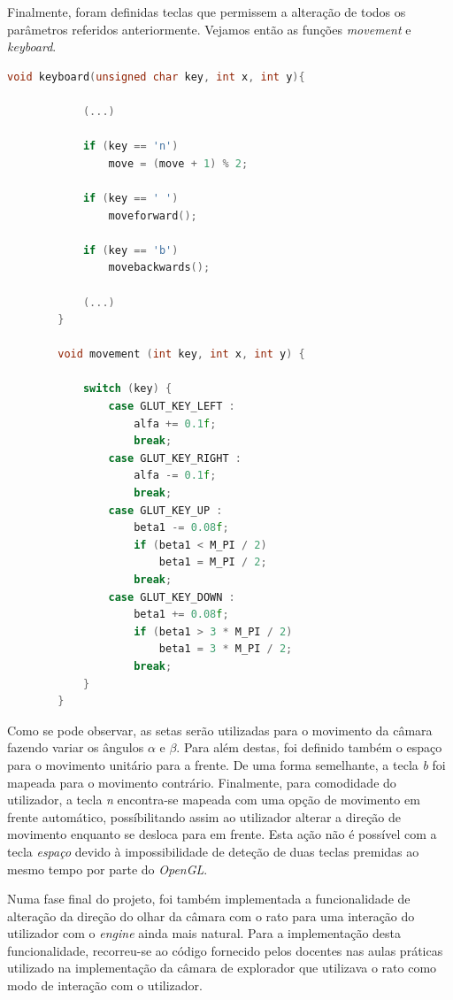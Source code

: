 \documentclass[a4paper]{article}
\begin{document}
Finalmente, foram definidas teclas que permissem a alteração de todos os parâmetros referidos anteriormente. Vejamos então as funções \textit{movement} e \textit{keyboard}.

\begin{lstlisting}[language=C++, caption=Definição das funções responsáveis pelo movimento para frente e trás da câmara.]
        void keyboard(unsigned char key, int x, int y){

            (...)

            if (key == 'n')
                move = (move + 1) % 2;

            if (key == ' ')
                moveforward();

            if (key == 'b')
                movebackwards();

            (...)
        }

        void movement (int key, int x, int y) {

            switch (key) {
                case GLUT_KEY_LEFT :
                    alfa += 0.1f;
                    break;
                case GLUT_KEY_RIGHT :
                    alfa -= 0.1f;
                    break;
                case GLUT_KEY_UP :
                    beta1 -= 0.08f;
                    if (beta1 < M_PI / 2)
                        beta1 = M_PI / 2;
                    break;
                case GLUT_KEY_DOWN :
                    beta1 += 0.08f;
                    if (beta1 > 3 * M_PI / 2)
                        beta1 = 3 * M_PI / 2;
                    break;
            }
        }
\end{lstlisting}

Como se pode observar, as setas serão utilizadas para o movimento da câmara fazendo variar os ângulos $\alpha$ e $\beta$. Para além destas, foi definido também o espaço para o movimento unitário para a frente. De uma forma semelhante, a tecla \textit{b} foi mapeada para o movimento contrário. Finalmente, para comodidade do utilizador, a tecla \textit{n} encontra-se mapeada com uma opção de movimento em frente automático, possíbilitando assim ao utilizador alterar a direção de movimento enquanto se desloca para em frente. Esta ação não é possível com a tecla \textit{espaço} devido à impossibilidade de deteção de duas teclas premidas ao mesmo tempo por parte do \textit{OpenGL}.

Numa fase final do projeto, foi também implementada a funcionalidade de alteração da direção do olhar da câmara com o rato para uma interação do utilizador com o \textit{engine} ainda mais natural. Para a implementação desta funcionalidade, recorreu-se ao código fornecido pelos docentes nas aulas práticas utilizado na implementação da câmara de explorador que utilizava o rato como modo de interação com o utilizador.
\end{document}
